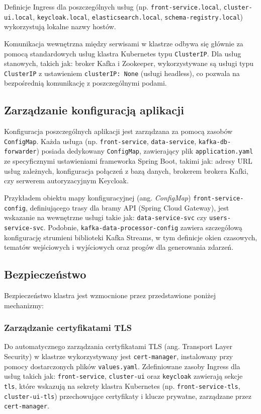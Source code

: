 Definicje Ingress dla poszczególnych usług (np. \texttt{front-service.local}, \texttt{cluster-ui.local}, \texttt{keycloak.local}, \texttt{elasticsearch.local}, \texttt{schema-registry.local}) wykorzystują lokalne nazwy hostów.

Komunikacja wewnętrzna między serwisami w klastrze odbywa się głównie za pomocą standardowych usług klastra Kubernetes typu \texttt{ClusterIP}. Dla usług stanowych, takich jak: broker Kafka i Zookeeper, wykorzystywane są usługi typu \texttt{ClusterIP} z ustawieniem \texttt{clusterIP: None} (usługi headless), co pozwala na bezpośrednią komunikację z poszczególnymi podami.

\subsection{Zarządzanie konfiguracją aplikacji} 

Konfiguracja poszczególnych aplikacji jest zarządzana za pomocą zasobów \texttt{ConfigMap}. Każda usługa (np. \texttt{front-service}, \texttt{data-service}, \texttt{kafka-db-forwarder}) posiada dedykowany \texttt{ConfigMap}, zawierający plik \texttt{application.yaml} ze specyficznymi ustawieniami frameworka Spring Boot, takimi jak: adresy URL usług zależnych, konfiguracja połączeń z bazą danych, brokerem brokera Kafki, czy serwerem autoryzacyjnym Keycloak.

Przykładem obiektu mapy konfiguracyjnej (ang. \textit{ConfigMap}) \texttt{front-service-config}, definiującego trasy dla bramy API (Spring Cloud Gateway), jest wskazanie na wewnętrzne usługi takie jak: \texttt{data-service-svc} czy \texttt{users-service-svc}. Podobnie, \texttt{kafka-data-processor-config} zawiera szczegółową konfigurację strumieni biblioteki Kafka Streams, w tym definicje okien czasowych, tematów wejściowych i wyjściowych oraz progów dla generowania zdarzeń.

\subsection{Bezpieczeństwo}

Bezpieczeństwo klastra jest wzmocnione przez przedstawione poniżej mechanizmy:

\subsubsection{Zarządzanie certyfikatami TLS}
Do automatycznego zarządzania certyfikatami TLS (ang. Transport Layer Security) w klastrze wykorzystywany jest \texttt{cert-manager}, instalowany przy pomocy dostarczonych plików \texttt{values.yaml}. Zdefiniowane zasoby Ingress dla usług takich jak: \texttt{front-service}, \texttt{cluster-ui} oraz \texttt{keycloak} zawierają sekcje \texttt{tls}, które wskazują na sekrety klastra Kubernetes (np. \texttt{front-service-tls}, \texttt{cluster-ui-tls}) przechowujące certyfikaty i klucze prywatne, zarządzane przez \texttt{cert-manager}.

